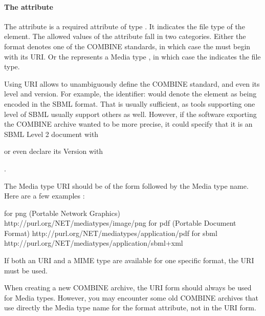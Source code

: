 \paragraph{The  attribute}
The  attribute is a required attribute of type . It 
indicates the file type of the \Content element. The allowed values of the 
 attribute fall in two categories. Either the format 
denotes one of the COMBINE standards, in which case the  
must begin with its  URI. Or the 
 represents a Media type \cite{rfc2046}, in which case the  
indicates the file type.

Using  URI allows to unambiguously define the COMBINE standard, and even its level and version. For example, the identifier:  would denote the \Content 
element as being encoded in the SBML format. That is usually sufficient, as tools supporting one level of SBML usually
support others as well. However, if the software exporting the COMBINE archive wanted to be more precise, it could specify that it is an SBML Level 2 document with 

\begin{center}
\end{center}

or even declare its Version with 

\begin{center}
.
\end{center}


The Media type  URI should be of the form 
followed by the Media type name. Here are a few examples :

\begin{example}
    for png (Portable Network Graphics) http://purl.org/NET/mediatypes/image/png
    for pdf (Portable Document Format) http://purl.org/NET/mediatypes/application/pdf
    for sbml http://purl.org/NET/mediatypes/application/sbml+xml
\end{example}

If both an  URI and a MIME type are available for one specific format, the
 URI must be used. 

When creating a new COMBINE archive, the URI form should always be used for Media types. However, you may encounter some
old COMBINE archives that use directly the Media type name for the format attribute, not in the URI form.


